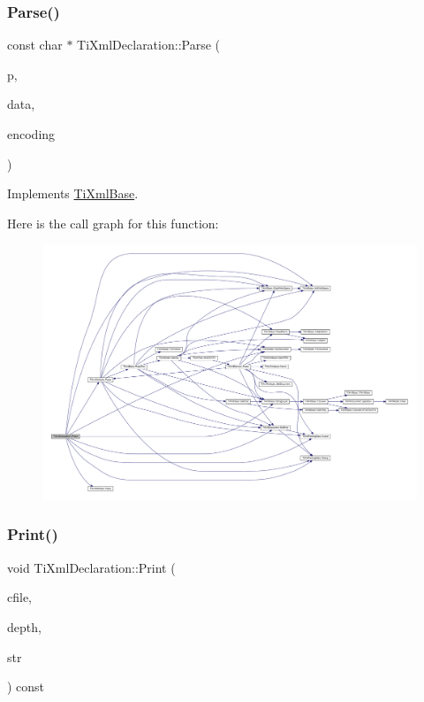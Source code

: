 \subsubsection{\texorpdfstring{Parse()}{Parse()}}
{\footnotesize\ttfamily const char $\ast$ Ti\+Xml\+Declaration\+::\+Parse (\begin{DoxyParamCaption}\item[{const char $\ast$}]{p,  }\item[{\hyperlink{class_ti_xml_parsing_data}{Ti\+Xml\+Parsing\+Data} $\ast$}]{data,  }\item[{\hyperlink{tinyxml_8h_a88d51847a13ee0f4b4d320d03d2c4d96}{Ti\+Xml\+Encoding}}]{encoding }\end{DoxyParamCaption})\hspace{0.3cm}{\ttfamily [virtual]}}



Implements \hyperlink{class_ti_xml_base_a00e4edb0219d00a1379c856e5a1d2025}{Ti\+Xml\+Base}.

Here is the call graph for this function\+:
\nopagebreak
\begin{figure}[H]
\begin{center}
\leavevmode
\includegraphics[width=350pt]{class_ti_xml_declaration_a9839ea97ed687a2b7342fd7b0f04361b_cgraph}
\end{center}
\end{figure}
\mbox{\label{class_ti_xml_declaration_ace687d02a5a25a060ae3802abb1b3f55}} 
\subsubsection{\texorpdfstring{Print()}{Print()}\hspace{0.1cm}{\footnotesize\ttfamily [1/2]}}
{\footnotesize\ttfamily void Ti\+Xml\+Declaration\+::\+Print (\begin{DoxyParamCaption}\item[{F\+I\+LE $\ast$}]{cfile,  }\item[{int}]{depth,  }\item[{\hyperlink{tinyxml_8h_a92bada05fd84d9a0c9a5bbe53de26887}{T\+I\+X\+M\+L\+\_\+\+S\+T\+R\+I\+NG} $\ast$}]{str }\end{DoxyParamCaption}) const\hspace{0.3cm}{\ttfamily [virtual]}}

